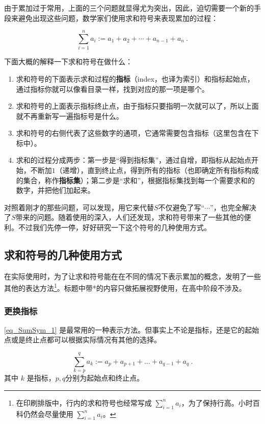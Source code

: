 由于累加过于常用，上面的三个问题就显得尤为突出，因此，迫切需要一个新的手段来避免出现这些问题，数学家们使用求和符号来表现累加的过程：

\begin{equation}\label{eq_SumSym_1}
\sum_{i=1}^n a_i:=a_1+a_2+\cdots+a_{n-1}+a_{n}~.
\end{equation}

下面大概的解释一下求和符号在做什么：
\begin{enumerate}
\item 求和符号的下面表示求和过程的\textbf{指标}（index，也译为索引）和指标起始点，通过指标你就可以像看目录一样，找到对应的那一项是哪个。
\item 求和符号的上面表示指标终止点，由于指标只要指明一次就可以了，所以上面就不再重新写一遍指标号是什么。
\item 求和符号的右侧代表了这些数字的通项，它通常需要包含指标（这里包含在下标中）。
\item 求和的过程分成两步：第一步是“得到指标集”，通过自增，即指标从起始点开始，不断加$1$（递增），直到终止点，得到所有的指标（也即确定所有指标构成的集合，称作\textbf{指标集}）；第二步是“求和”，根据指标集找到每一个需要求和的数字，并把他们加起来。
\end{enumerate}

对照着刚才的那些问题，可以发现，用它来代替$S$不仅避免了写“$\cdots$”，也完全解决了$S$带来的问题。随着使用的深入，人们还发现，求和符号带来了一些其他的便利。不过我们先停一停，好好研究一下这个符号的几种使用方式。

\subsection{求和符号的几种使用方式}

在实际使用时，为了让求和符号能在在不同的情况下表示累加的概念，发明了一些其他的表达方法\footnote{在印刷排版中，行内的求和符号也经常写成 $\sum_{i=1}^n a_i$，为了保持行高。小时百科仍然会尽量使用 $\sum\limits_{i=1}^n a_i$。}。标题中带*的内容只做拓展视野使用，在高中阶段不涉及。

\subsubsection{更换指标}

\autoref{eq_SumSym_1} 是最常用的一种表示方法。但事实上不论是指标，还是它的起始点或是终止点都可以根据实际情况有其他的选择。

\begin{equation}
\sum_{k=p}^q a_k := a_p + a_{p+1} + \dots +a_{q-1}+ a_q~.
\end{equation}
其中 $k$ 是指标，$p,q$分别为起始点和终止点。

